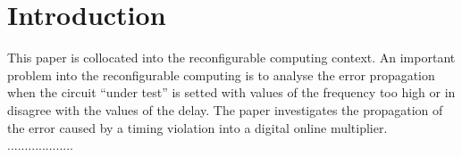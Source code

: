\documentclass[journal]{IEEEtran}
\begin{document}
\begin{abstract}

\end{abstract}

\begin{IEEEkeywords}

\end{IEEEkeywords}






%
\IEEEpeerreviewmaketitle



\section{Introduction}
This paper is collocated into the reconfigurable computing context. An important problem into the reconfigurable computing is to analyse the error propagation when the circuit ``under test'' is setted with values of the frequency too high or in disagree with the values of the delay. The paper investigates the propagation of the error caused by a timing violation into a digital online multiplier. \\

...................\\
\end{document}
